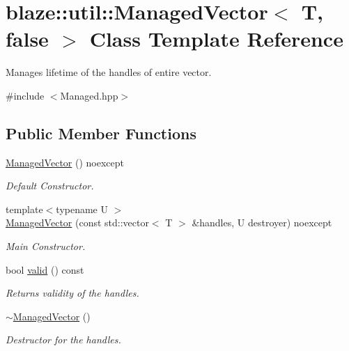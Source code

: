 \hypertarget{classblaze_1_1util_1_1ManagedVector_3_01T_00_01false_01_4}{}\section{blaze\+:\+:util\+:\+:Managed\+Vector$<$ T, false $>$ Class Template Reference}
\label{classblaze_1_1util_1_1ManagedVector_3_01T_00_01false_01_4}


Manages lifetime of the handles of entire vector.  




{\ttfamily \#include $<$Managed.\+hpp$>$}

\subsection*{Public Member Functions}
\begin{DoxyCompactItemize}
\item 
\mbox{\label{classblaze_1_1util_1_1ManagedVector_3_01T_00_01false_01_4_a9295e02fcc9d0c5afc6a2d5c8bfecfe0}} 
\hyperlink{classblaze_1_1util_1_1ManagedVector_3_01T_00_01false_01_4_a9295e02fcc9d0c5afc6a2d5c8bfecfe0}{Managed\+Vector} () noexcept
\begin{DoxyCompactList}\small\item\em Default Constructor. \end{DoxyCompactList}\item 
{\footnotesize template$<$typename U $>$ }\\\hyperlink{classblaze_1_1util_1_1ManagedVector_3_01T_00_01false_01_4_abaf98d296e4f9f2c1cc2a4fb819def5b}{Managed\+Vector} (const std\+::vector$<$ T $>$ \&handles, U destroyer) noexcept
\begin{DoxyCompactList}\small\item\em Main Constructor. \end{DoxyCompactList}\item 
bool \hyperlink{classblaze_1_1util_1_1ManagedVector_3_01T_00_01false_01_4_a35ba5f24d9828ad6ff77da7593780290}{valid} () const
\begin{DoxyCompactList}\small\item\em Returns validity of the handles. \end{DoxyCompactList}\item 
\mbox{\label{classblaze_1_1util_1_1ManagedVector_3_01T_00_01false_01_4_a79d961fa62b52123bf2f0dbe6e5939e4}} 
\hyperlink{classblaze_1_1util_1_1ManagedVector_3_01T_00_01false_01_4_a79d961fa62b52123bf2f0dbe6e5939e4}{$\sim$\+Managed\+Vector} ()
\begin{DoxyCompactList}\small\item\em Destructor for the handles. \end{DoxyCompactList}\end{DoxyCompactItemize}
